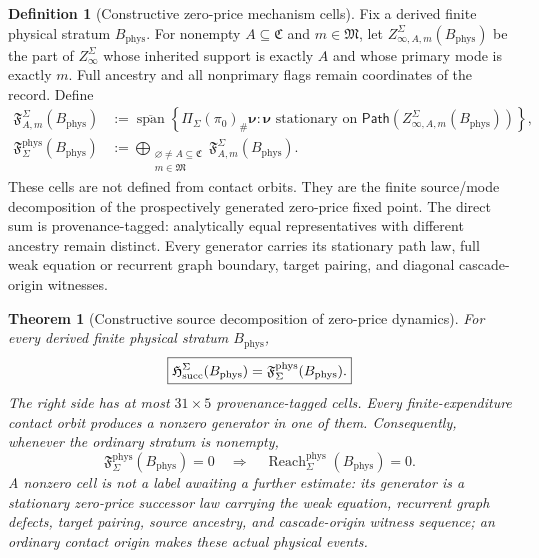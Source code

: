 \documentclass[11pt]{article}
\numberwithin{section}{part}
\theoremstyle{plain}
\newtheorem{theorem}{Theorem}[section]
\theoremstyle{definition}
\newtheorem{definition}[definition]{Definition}
\theoremstyle{remark}
\newcommand{\Channels}{\mathfrak C}
\newcommand{\Modes}{\mathfrak M}
\newcommand{\Reach}{\operatorname{Reach}}
\newcommand{\Phys}{\mathrm{phys}}
\newcommand{\Budget}{B_{\Phys}}
\begin{document}
\begin{definition}[Constructive zero-price mechanism cells]
\label{def:realized-singularity-formation-cells}
Fix a derived finite physical stratum \(\Budget\).  For nonempty
\(A\subseteq\Channels\) and \(m\in\Modes\), let
\(Z_{\infty,A,m}^{\Sigma}(\Budget)\) be the part of
\(Z_\infty^\Sigma\) whose inherited support is exactly \(A\) and whose
primary mode is exactly \(m\).  Full ancestry and all nonprimary flags remain
coordinates of the record.  Define
\begin{align}
 \mathfrak F_{A,m}^{\Sigma}(\Budget)
 &:=
 \overline{\operatorname{span}}
 \left\{
  \Pi_\Sigma(\pi_0)_\#\boldsymbol\nu:
  \boldsymbol\nu\text{ stationary on }
  \mathsf{Path}(Z_{\infty,A,m}^{\Sigma}(\Budget))
 \right\},\label{eq:realized-formation-cell}\\
 \mathfrak F_{\Sigma}^{\Phys}(\Budget)
 &:=
 \bigoplus_{\substack{\varnothing\ne A\subseteq\Channels\\m\in\Modes}}
 \mathfrak F_{A,m}^{\Sigma}(\Budget).\label{eq:total-formation-algebra}
\end{align}
These cells are not defined from contact orbits.  They are the finite
source/mode decomposition of the prospectively generated zero-price fixed
point.  The direct sum is provenance-tagged: analytically equal
representatives with different ancestry remain distinct.  Every generator
carries its stationary path law, full weak equation or recurrent graph
boundary, target pairing, and diagonal cascade-origin witnesses.
\end{definition}

\begin{theorem}[Constructive source decomposition of zero-price dynamics]
\label{thm:constructive-zero-price-source-decomposition}
For every derived finite physical stratum \(\Budget\),
\begin{equation}
 \label{eq:reachability-formation-equivalence}
 \boxed{
 \mathfrak H_{\rm succ}^{\Sigma}(\Budget)
 =\mathfrak F_{\Sigma}^{\Phys}(\Budget).}
\end{equation}
The right side has at most \(31\times5\) provenance-tagged cells.  Every
finite-expenditure contact orbit produces a nonzero generator in one of them.
Consequently, whenever the ordinary stratum is nonempty,
\begin{equation}
 \label{eq:zero-mechanism-implies-avoidance}
 \mathfrak F_{\Sigma}^{\Phys}(\Budget)=0
 \quad\Longrightarrow\quad
 \Reach_\Sigma^{\Phys}(\Budget)=0.
\end{equation}
A nonzero cell is not a label awaiting a further estimate: its generator is a
stationary zero-price successor law carrying the weak equation, recurrent
graph defects, target pairing, source ancestry, and cascade-origin witness
sequence; an ordinary contact origin makes these actual physical events.
\end{theorem}
\end{document}
